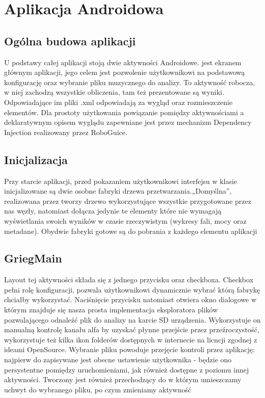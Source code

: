 \chapter{Aplikacja Androidowa}
\section{Ogólna budowa aplikacji}
U podstawy całej aplikacji stoją dwie aktywności Androidowe.  jest ekranem głównym aplikacji, jego celem jest pozwolenie użytkownikowi na podstawową konfigurację oraz wybranie pliku muzycznego do analizy.  To aktywność robocza, w niej zachodzą wszystkie obliczenia, tam też prezentowane są wyniki. Odpowiadające im pliki .xml odpowiadają za wygląd oraz rozmieszczenie elementów. Dla prostoty użytkowania powiązanie pomiędzy aktywnościami a deklaratywnym opisem wyglądu zapewniane jest przez mechanizm Dependency Injection realizowany przez RoboGuice.

\section{Inicjalizacja}
Przy starcie aplikacji, przed pokazaniem użytkownikowi interfejsu w klasie  inicjalizowane są dwie osobne fabryki drzewa przetwarzania.„Domyślna”, realizowana przez  tworzy drzewo wykorzystujące wszystkie przygotowane przez nas węzły, natomiast  dołącza jedynie te elementy które nie wymagają wyświetlania swoich wyników w czasie rzeczywistym (wykresy fali, mocy oraz metadane). Obydwie fabryki gotowe są do pobrania z każdego elementu aplikacji

\section{GriegMain}
Layout tej aktywności składa się z jednego przycisku oraz checkboxa. Checkbox pełni rolę konfiguracji, pozwala użytkownikowi dynamicznie wybrać którą fabrykę chciałby wykorzystać. Naciśnięcie przycisku natomiast otwiera okno dialogowe w którym znajduje się nasza prosta implementacja eksploratora plików pozwalającego odnaleźć plik do analizy na karcie SD urządzenia. Wykorzystuje on manualną kontrolę kanału alfa by uzyskać płynne przejście przez przeźroczystość, wykorzystuje też kilka ikon folderów dostępnych w internecie na licncji zgodnej z ideami OpenSource. Wybranie pliku powoduje przejęcie kontroli przez aplikację: najpierw do  zapisywane jest obecne ustawienie użytkownika - będzie ono persystentne pomiędzy uruchomieniami, jak również dostępne z poziomu innej aktywności. Tworzony jest również  przechodzący do  w którym umieszczamy uchwyt do wybranego pliku, po czym zmieniamy aktywność

